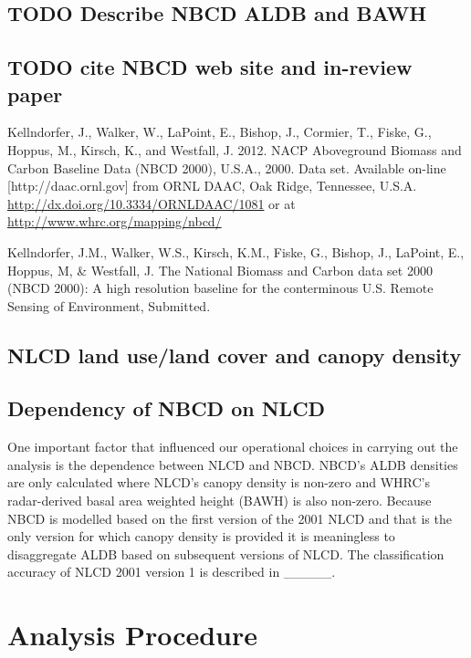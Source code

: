 \documentclass[11pt]{article}
\begin{document}
\subsection{\textbf{TODO} Describe NBCD ALDB and BAWH}
\label{sec-2-1}
\subsection{\textbf{TODO} cite NBCD web site and in-review paper}
\label{sec-2-2}


Kellndorfer, J., Walker, W., LaPoint, E., Bishop, J., Cormier, T.,
Fiske, G., Hoppus, M., Kirsch, K., and Westfall, J. 2012. NACP
Aboveground Biomass and Carbon Baseline Data (NBCD 2000),
U.S.A., 2000. Data set. Available on-line [http://daac.ornl.gov] from
ORNL DAAC, Oak Ridge, Tennessee,
U.S.A. \href{http://dx.doi.org/10.3334/ORNLDAAC/1081}{http://dx.doi.org/10.3334/ORNLDAAC/1081} or at
\href{http://www.whrc.org/mapping/nbcd/}{http://www.whrc.org/mapping/nbcd/}

Kellndorfer, J.M., Walker, W.S., Kirsch, K.M., Fiske, G., Bishop, J.,
LaPoint, E., Hoppus, M, \& Westfall, J. The National Biomass and Carbon
data set 2000 (NBCD 2000): A high resolution baseline for the
conterminous U.S. Remote Sensing of Environment, Submitted.
\subsection{NLCD land use/land cover and canopy density}
\label{sec-2-3}
\subsection{Dependency of NBCD on NLCD}
\label{sec-2-4}


One important factor that influenced our operational choices in
carrying out the analysis is the dependence between NLCD and NBCD.
NBCD's ALDB densities are only calculated where NLCD's canopy density
is non-zero and WHRC's radar-derived basal area weighted height
(BAWH) is also non-zero.  Because NBCD is modelled based on the first
version of the 2001 NLCD and that is the only version for which
canopy density is provided it is meaningless to disaggregate ALDB
based on subsequent versions of NLCD.  The classification accuracy of
NLCD 2001 version 1 is described in _____.  
\section{Analysis Procedure}
\label{sec-3}
\end{document}
